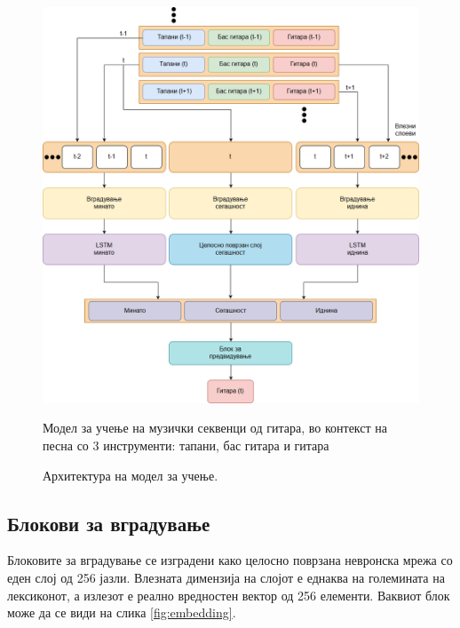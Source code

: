 \begin{figure}[H]
	\centering
    \includegraphics[scale=0.42]{images/arch.png}
	\caption{Архитектура на модел за учење.}
	Модел за учење на музички секвенци од гитара, во контекст на песна со 3 инструменти: тапани, бас гитара и гитара
	\label{fig:architecture}
\end{figure}


\subsection{Блокови за вградување}

Блоковите за вградување се изградени како целосно поврзана невронска мрежа со еден слој од 256 јазли. Влезната димензија на слојот е еднаква на големината на лексиконот, а излезот е реално вредностен вектор од 256 елементи. Ваквиот блок може да се види на слика \ref{fig:embedding}.

